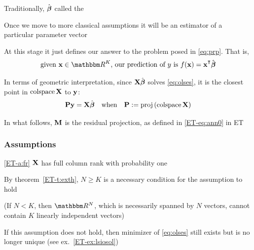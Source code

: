 \begin{frame}
    
    \vspace{2em}
    Traditionally, $\hat {\boldsymbol \beta}$ called the 
    
    Once we move to more classical assumptions it 
    will be an estimator of a particular parameter vector
    
    \vspace{.7em}
    At this stage it just
    defines our answer to the problem posed in \eqref{eq:prp}.  That is,
    \begin{equation*}
        \text{given $\boldx \in \RR^K$, our prediction of $y$ is }
        f(\boldx) = \boldx^\T \hboldbeta
    \end{equation*}
    
\end{frame}

\begin{frame}
    
    \vspace{2em}
    In terms of geometric interpretation, since $\mathbf X \hat {\boldsymbol \beta}$ solves
    \eqref{eq:olses}, it is the closest point in $\operatorname{colspace} \mathbf X$
    to ${\mathbf y}$:
    \begin{equation*}
        \mathbf P {\mathbf y} = \mathbf X \hat {\boldsymbol \beta}   
        \quad \text{when} \quad
        \mathbf P := \operatorname{proj} \, (\operatorname{colspace} \mathbf X )
    \end{equation*}
    
    \vspace{.7em}
    In what follows,
    $\mathbf M$ is the residual projection, as defined in \eqref{ET-eq:ann0} in ET

\end{frame}

\begin{frame}\frametitle{Assumptions}
 
    \vspace{2em}
    \Ass\eqref{ET-a:fr} 
    $\mathbf X$ has full column rank with probability one
      
    By theorem~\ref{ET-t:exth}, $N \geq K$ is a necessary
    condition for the assumption to hold
    
    (If $N < K$, then $\RR^N$, which
    is necessarily spanned by $N$ vectors, cannot contain $K$ linearly
    independent vectors)
    
    \vspace{.7em}
    If this assumption does not hold, then minimizer of \eqref{eq:olses} still exists
    but is no longer unique (see ex.~\ref{ET-ex:lsiosol})  
    
\end{frame}

